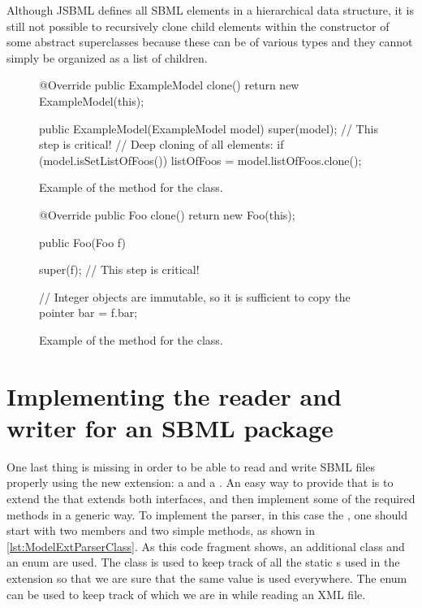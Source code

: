 Although JSBML defines all SBML elements in a hierarchical data structure, it
is still not possible to recursively clone child elements within the
constructor of some abstract superclasses because these can be of various
types and they cannot simply be organized as a list of children.

\begin{figure}[htb]
  \begin{example}[numbers=left]
@Override public ExampleModel clone() {
  return new ExampleModel(this);
}

public ExampleModel(ExampleModel model) {
  super(model);  // This step is critical!
  // Deep cloning of all elements:
  if (model.isSetListOfFoos()) {
    listOfFoos = model.listOfFoos.clone();
  }
}\end{example}
 \caption{Example of the  method for the  class.}
 \label{lst:ModelExtClone}
\end{figure}

\begin{figure}[htb]
  \begin{example}[numbers=left]
@Override public Foo clone() {
  return new Foo(this);
}

public Foo(Foo f) {
  super(f);  // This step is critical!

  // Integer objects are immutable, so it is sufficient to copy the pointer
  bar = f.bar;
}\end{example}
  \caption{Example of the  method for the  class.}
  \label{lst:ModelExtCloneFoo}
\end{figure}


\section{Implementing the reader and writer for an SBML package}

One last thing is missing in order to be able to read and write SBML files properly
using the new extension: a  and a . An easy way to provide that is
to extend the \AbstractReaderWriter that extends both interfaces, and then implement some of 
the required methods in a generic way. To
implement the parser, in this case the , one should
start with two members and two simple methods, as shown in
\vref{lst:ModelExtParserClass}. As this code fragment shows, an additional class
 and an enum  are used. The class 
is used to keep track of all the static \String{}s used in the extension so that we are sure 
that the same value is used everywhere. The enum   can be used to keep
track of which  we are in while reading an XML file.

